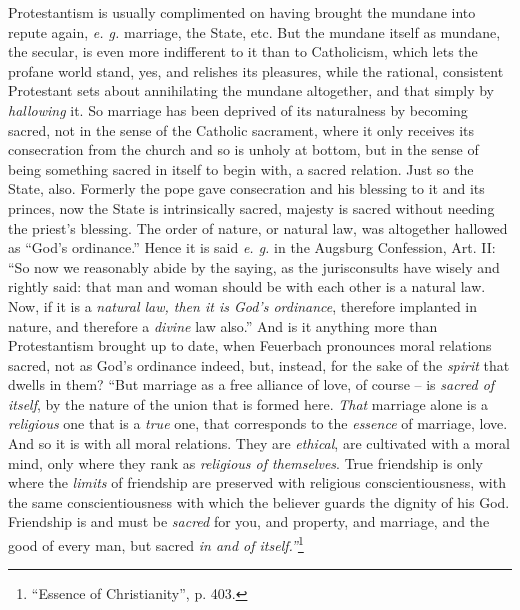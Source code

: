 \documentclass[12pt,a4paper]{book}
\begin{document}
Protestantism is usually complimented on having brought the mundane into 
repute again, \textit{e. g.} marriage, the State, etc. But the mundane itself 
as mundane, the secular, is even more indifferent to it than to Catholicism, 
which lets the profane world stand, yes, and relishes its pleasures, while the 
rational, consistent Protestant sets about annihilating the mundane 
altogether, and that simply by \textit{hallowing} it. So marriage has been 
deprived of its naturalness by becoming sacred, not in the sense of the 
Catholic sacrament, where it only receives its consecration from the church 
and so is unholy at bottom, but in the sense of being something sacred in 
itself to begin with, a sacred relation. Just so the State, also. Formerly the 
pope gave consecration and his blessing to it and its princes, now the State 
is intrinsically sacred, majesty is sacred without needing the priest's 
blessing. The order of nature, or natural law, was altogether hallowed as 
``God's ordinance.'' Hence it is said \textit{e. g.} in the Augsburg 
Confession, Art. II: ``So now we reasonably abide by the saying, as the 
jurisconsults have wisely and rightly said: that man and woman should be with 
each other is a natural law. Now, if it is a \textit{natural law, then it is 
God's ordinance}, therefore implanted in nature, and therefore a 
\textit{divine} law also.'' And is it anything more than Protestantism 
brought up to date, when Feuerbach pronounces moral relations sacred, not as 
God's ordinance indeed, but, instead, for the sake of the \textit{spirit} that 
dwells in them? ``But marriage as a free alliance of love, of course -- is 
\textit{sacred of itself}, by the nature of the union that is formed here. 
\textit{That} marriage alone is a \textit{religious} one that is a 
\textit{true} one, that corresponds to the \textit{essence} of marriage, love. 
And so it is with all moral relations. They are \textit{ethical}, are 
cultivated with a moral mind, only where they rank as \textit{religious of 
themselves}. True friendship is only where the \textit{limits} of friendship 
are preserved with religious conscientiousness, with the same 
conscientiousness with which the believer guards the dignity of his God. 
Friendship is and must be \textit{sacred} for you, and property, and marriage, 
and the good of every man, but sacred \textit{in and of 
itself.''}\footnote{``Essence of Christianity'', p. 403.}
\end{document}
